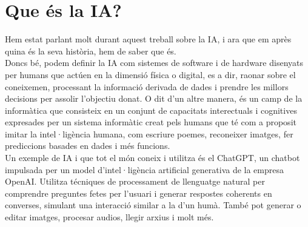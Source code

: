 \section{Que és la IA?}
Hem estat parlant molt durant aquest treball sobre la IA, i ara que em après quina és la seva història, hem de saber que és. \\
Doncs bé, podem definir la IA com sistemes de software i de hardware disenyats per humans que actúen en la dimensió física o digital, es a dir, raonar sobre el coneixemen, processant la informació derivada de dades i prendre les millors decisions per assolir l'objectiu donat. O dit d'un altre manera, és un camp de la informàtica que consisteix en un conjunt de capacitats interectuals i cognitives expresades per un sistema informàtic creat pels humans que té com a proposit imitar la intel·ligència humana, com escriure poemes, reconeixer imatges, fer prediccions basades en dades i més funcions. \\
Un exemple de IA i que tot el món coneix i utilitza és el ChatGPT, un chatbot impulsada per un model d'intel·ligència artificial generativa de la empresa OpenAI. Utilitza técniques de processament de llenguatge natural per comprendre preguntes fetes per l'usuari i generar respostes coherents en converses, simulant una interacció similar a la d'un humà. També pot generar o editar imatges, procesar audios, llegir arxius i molt més.

